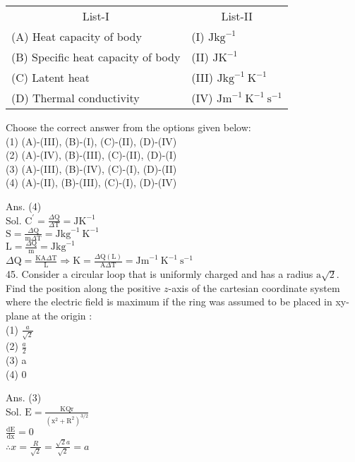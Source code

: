 \documentclass[10pt]{article}
\begin{document}
\begin{center}
\begin{tabular}{ll}
\multicolumn{1}{c}{List-I} & \multicolumn{1}{c}{List-II} \\
(A) Heat capacity of body & (I) \(\mathrm{J} \mathrm{kg}^{-1}\) \\
(B) Specific heat capacity of body & (II) \(\mathrm{JK}^{-1}\) \\
(C) Latent heat & (III) \(\mathrm{J} \mathrm{kg}^{-1} \mathrm{~K}^{-1}\) \\
(D) Thermal conductivity & (IV) \(\mathrm{Jm}^{-1} \mathrm{~K}^{-1} \mathrm{~s}^{-1}\) \\
\end{tabular}
\end{center}

Choose the correct answer from the options given below:\\
(1) (A)-(III), (B)-(I), (C)-(II), (D)-(IV)\\
(2) (A)-(IV), (B)-(III), (C)-(II), (D)-(I)\\
(3) (A)-(III), (B)-(IV), (C)-(I), (D)-(II)\\
(4) (A)-(II), (B)-(III), (C)-(I), (D)-(IV)

Ans. (4)\\
Sol. \(\mathrm{C}^{\prime}=\frac{\Delta \mathrm{Q}}{\Delta \mathrm{T}}=\mathrm{JK}^{-1}\)\\
\(\mathrm{S}=\frac{\Delta \mathrm{Q}}{\mathrm{m} \Delta \mathrm{T}}=\mathrm{Jkg}^{-1} \mathrm{~K}^{-1}\)\\
\(\mathrm{L}=\frac{\Delta \mathrm{Q}}{\mathrm{m}}=\mathrm{Jkg}^{-1}\)\\
\(\Delta \mathrm{Q}=\frac{\mathrm{KA} \Delta \mathrm{T}}{\mathrm{L}} \Rightarrow \mathrm{K}=\frac{\Delta \mathrm{Q}(\mathrm{L})}{\mathrm{A} \Delta \mathrm{T}}=\mathrm{Jm}^{-1} \mathrm{~K}^{-1} \mathrm{~s}^{-1}\)\\
45. Consider a circular loop that is uniformly charged and has a radius \(\mathrm{a} \sqrt{2}\). Find the position along the positive \(z\)-axis of the cartesian coordinate system where the electric field is maximum if the ring was assumed to be placed in xy-plane at the origin :\\
(1) \(\frac{a}{\sqrt{2}}\)\\
(2) \(\frac{a}{2}\)\\
(3) a\\
(4) 0

Ans. (3)\\
Sol. \(\mathrm{E}=\frac{\mathrm{KQr}}{\left(\mathrm{x}^{2}+\mathrm{R}^{2}\right)^{3 / 2}}\)\\
\(\frac{\mathrm{dE}}{\mathrm{dx}}=0\)\\
\(\therefore x=\frac{R}{\sqrt{2}}=\frac{\sqrt{2} a}{\sqrt{2}}=a\)
\end{document}
